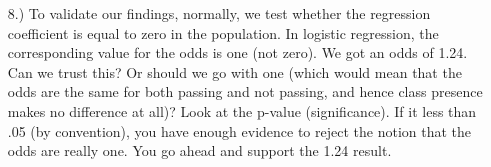 \documentclass[a4paper,12pt]{article}
\begin{document}
\begin{itemize}
	\item[8.)] To validate our findings, normally, we test whether the regression coefficient is equal to zero in the population.
	In logistic regression, the corresponding value for the odds is one (not zero). We got an odds of 1.24.
	Can we trust this? Or should we go with one (which would mean that the odds are the same for both passing and not passing,
	and hence class presence makes no difference at all)?  Look at the p-value (significance). If it less than .05 (by convention), you have enough evidence to reject
	the notion that the odds are really one. You go ahead and support the 1.24 result.
\end{itemize}
\end{document}
